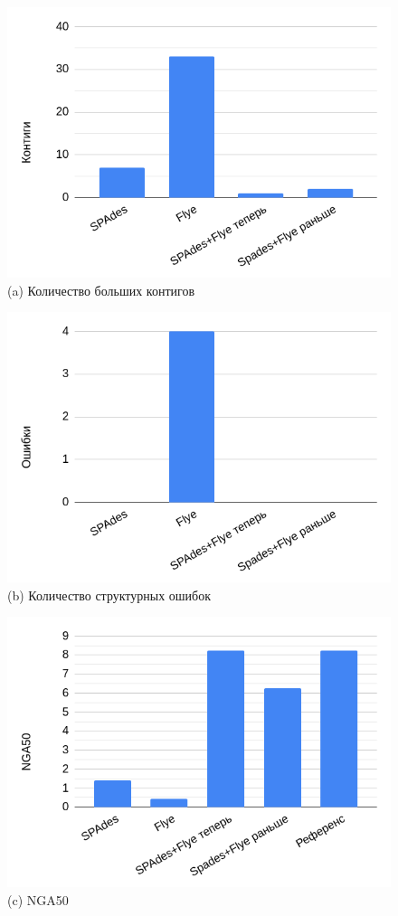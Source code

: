 \documentclass[14pt]{matmex-diploma-custom}
\begin{document}
\begin{figure}[h]
\begin{minipage}{0.5\textwidth}
	\centering
	\includegraphics[scale=0.4]{contigs2.png} \small{(a) Количество больших контигов}
\end{minipage}
\begin{minipage}{0.5\textwidth}
	\centering
	\includegraphics[scale=0.4]{mis2.png} \small{(b) Количество структурных ошибок}
\end{minipage}
\begin{minipage}{0.5\textwidth}
	\centering
	\includegraphics[scale=0.4]{nga2.png} \small{(c) NGA50}

\end{minipage}
\end{figure}
\end{document}
